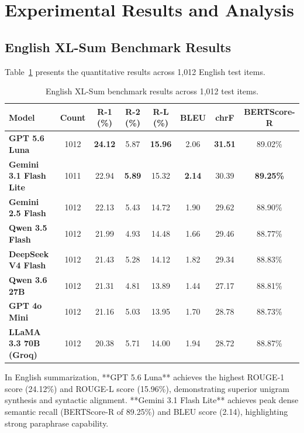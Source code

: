 \documentclass[runningheads]{llncs}
\begin{document}
%
%
\section{Experimental Results and Analysis}\label{sec:results}

\subsection{English XL-Sum Benchmark Results}\label{subsec:english_results}

Table~\ref{tab:english_results} presents the quantitative results across 1,012 English test items.

\begin{table}[t]
\caption{English XL-Sum benchmark results across 1,012 test items.}\label{tab:english_results}
\centering
\small
\begin{tabular}{lccccccc}
\toprule
\textbf{Model} & \textbf{Count} & \textbf{R-1 (\%)} & \textbf{R-2 (\%)} & \textbf{R-L (\%)} & \textbf{BLEU} & \textbf{chrF} & \textbf{BERTScore-R} \\
\midrule
\textbf{GPT 5.6 Luna} & 1012 & \textbf{24.12} & 5.87 & \textbf{15.96} & 2.06 & \textbf{31.51} & 89.02\% \\
\textbf{Gemini 3.1 Flash Lite} & 1011 & 22.94 & \textbf{5.89} & 15.32 & \textbf{2.14} & 30.39 & \textbf{89.25\%} \\
\textbf{Gemini 2.5 Flash} & 1012 & 22.13 & 5.43 & 14.72 & 1.90 & 29.62 & 88.90\% \\
\textbf{Qwen 3.5 Flash} & 1012 & 21.99 & 4.93 & 14.48 & 1.66 & 29.46 & 88.77\% \\
\textbf{DeepSeek V4 Flash} & 1012 & 21.43 & 5.28 & 14.12 & 1.82 & 29.34 & 88.83\% \\
\textbf{Qwen 3.6 27B} & 1012 & 21.31 & 4.81 & 13.89 & 1.44 & 27.17 & 88.81\% \\
\textbf{GPT 4o Mini} & 1012 & 21.16 & 5.03 & 13.95 & 1.70 & 28.78 & 88.73\% \\
\textbf{LLaMA 3.3 70B (Groq)} & 1012 & 20.38 & 5.71 & 14.00 & 1.94 & 28.72 & 88.87\% \\
\bottomrule
\end{tabular}
\end{table}

In English summarization, **GPT 5.6 Luna** achieves the highest ROUGE-1 score (24.12\%) and ROUGE-L score (15.96\%), demonstrating superior unigram synthesis and syntactic alignment. **Gemini 3.1 Flash Lite** achieves peak dense semantic recall (BERTScore-R of 89.25\%) and BLEU score (2.14), highlighting strong paraphrase capability.
\end{document}
